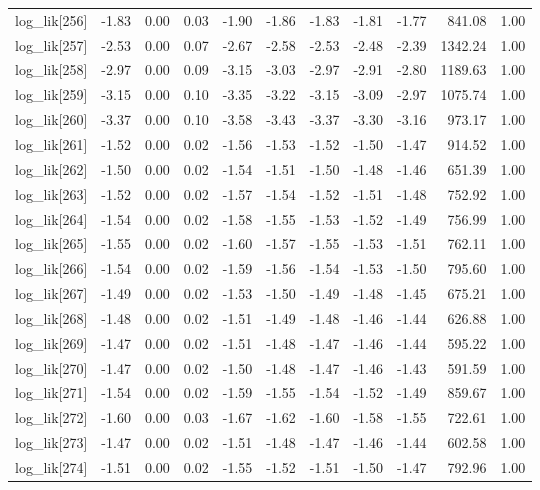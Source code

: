 \begin{table}[ht]
\begin{tabular}{rrrrrrrrrrr}
  log\_lik[256] & -1.83 & 0.00 & 0.03 & -1.90 & -1.86 & -1.83 & -1.81 & -1.77 & 841.08 & 1.00 \\ 
  log\_lik[257] & -2.53 & 0.00 & 0.07 & -2.67 & -2.58 & -2.53 & -2.48 & -2.39 & 1342.24 & 1.00 \\ 
  log\_lik[258] & -2.97 & 0.00 & 0.09 & -3.15 & -3.03 & -2.97 & -2.91 & -2.80 & 1189.63 & 1.00 \\ 
  log\_lik[259] & -3.15 & 0.00 & 0.10 & -3.35 & -3.22 & -3.15 & -3.09 & -2.97 & 1075.74 & 1.00 \\ 
  log\_lik[260] & -3.37 & 0.00 & 0.10 & -3.58 & -3.43 & -3.37 & -3.30 & -3.16 & 973.17 & 1.00 \\ 
  log\_lik[261] & -1.52 & 0.00 & 0.02 & -1.56 & -1.53 & -1.52 & -1.50 & -1.47 & 914.52 & 1.00 \\ 
  log\_lik[262] & -1.50 & 0.00 & 0.02 & -1.54 & -1.51 & -1.50 & -1.48 & -1.46 & 651.39 & 1.00 \\ 
  log\_lik[263] & -1.52 & 0.00 & 0.02 & -1.57 & -1.54 & -1.52 & -1.51 & -1.48 & 752.92 & 1.00 \\ 
  log\_lik[264] & -1.54 & 0.00 & 0.02 & -1.58 & -1.55 & -1.53 & -1.52 & -1.49 & 756.99 & 1.00 \\ 
  log\_lik[265] & -1.55 & 0.00 & 0.02 & -1.60 & -1.57 & -1.55 & -1.53 & -1.51 & 762.11 & 1.00 \\ 
  log\_lik[266] & -1.54 & 0.00 & 0.02 & -1.59 & -1.56 & -1.54 & -1.53 & -1.50 & 795.60 & 1.00 \\ 
  log\_lik[267] & -1.49 & 0.00 & 0.02 & -1.53 & -1.50 & -1.49 & -1.48 & -1.45 & 675.21 & 1.00 \\ 
  log\_lik[268] & -1.48 & 0.00 & 0.02 & -1.51 & -1.49 & -1.48 & -1.46 & -1.44 & 626.88 & 1.00 \\ 
  log\_lik[269] & -1.47 & 0.00 & 0.02 & -1.51 & -1.48 & -1.47 & -1.46 & -1.44 & 595.22 & 1.00 \\ 
  log\_lik[270] & -1.47 & 0.00 & 0.02 & -1.50 & -1.48 & -1.47 & -1.46 & -1.43 & 591.59 & 1.00 \\ 
  log\_lik[271] & -1.54 & 0.00 & 0.02 & -1.59 & -1.55 & -1.54 & -1.52 & -1.49 & 859.67 & 1.00 \\ 
  log\_lik[272] & -1.60 & 0.00 & 0.03 & -1.67 & -1.62 & -1.60 & -1.58 & -1.55 & 722.61 & 1.00 \\ 
  log\_lik[273] & -1.47 & 0.00 & 0.02 & -1.51 & -1.48 & -1.47 & -1.46 & -1.44 & 602.58 & 1.00 \\ 
  log\_lik[274] & -1.51 & 0.00 & 0.02 & -1.55 & -1.52 & -1.51 & -1.50 & -1.47 & 792.96 & 1.00 \\ 

\end{tabular}
\end{table}
